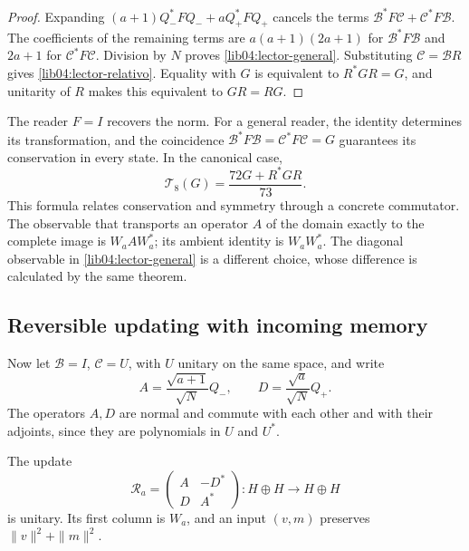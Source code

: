 \begin{proof}
Expanding \((a+1)Q_-^*FQ_-+aQ_+^*FQ_+\) cancels the
terms \(\mathcal B^*F\mathcal C+\mathcal C^*F\mathcal B\).
The coefficients of the remaining terms are
\(a(a+1)(2a+1)\) for \(\mathcal B^*F\mathcal B\) and \(2a+1\)
for \(\mathcal C^*F\mathcal C\). Division by \(N\) proves
\eqref{lib04:lector-general}. Substituting \(\mathcal C=\mathcal BR\)
gives \eqref{lib04:lector-relativo}. Equality with \(G\) is equivalent
to \(R^*GR=G\), and unitarity of \(R\) makes this equivalent to
\(GR=RG\).
\end{proof}

The reader \(F=I\) recovers the norm. For a general reader, the
identity determines its transformation, and the coincidence
\(\mathcal B^*F\mathcal B=\mathcal C^*F\mathcal C=G\) guarantees
its conservation in every state. In the canonical case,
\begin{equation}
 \mathcal T_8(G)=\frac{72G+R^*GR}{73}.
 \label{lib04:lector-72}
\end{equation}
This formula relates conservation and symmetry through a concrete
commutator. The observable that transports an operator
\(A\) of the domain exactly to the complete image is \(W_aAW_a^*\); its
ambient identity is \(W_aW_a^*\). The diagonal observable in
\eqref{lib04:lector-general} is a different choice, whose difference is
calculated by the same theorem.

\subsection{Reversible updating with incoming memory}
\label{lib04:reentrada}

Now let \(\mathcal B=I\), \(\mathcal C=U\), with \(U\)
unitary on the same space, and write
\begin{equation}
 A=\frac{\sqrt{a+1}}{\sqrt N}Q_-,\qquad
 D=\frac{\sqrt a}{\sqrt N}Q_+.
 \label{lib04:ad}
\end{equation}
The operators \(A,D\) are normal and commute with each other and with
their adjoints, since they are polynomials in \(U\) and \(U^*\).

\begin{theorem}
\label{lib04:teo-unitaria}
The update
\begin{equation}
 \mathscr R_a=
 \begin{pmatrix}A&-D^*\\D&A^*\end{pmatrix}:H\oplus H\to H\oplus H
 \label{lib04:unitaria}
\end{equation}
is unitary. Its first column is \(W_a\), and an input
\((v,m)\) preserves \(\|v\|^2+\|m\|^2\).
\end{theorem}

